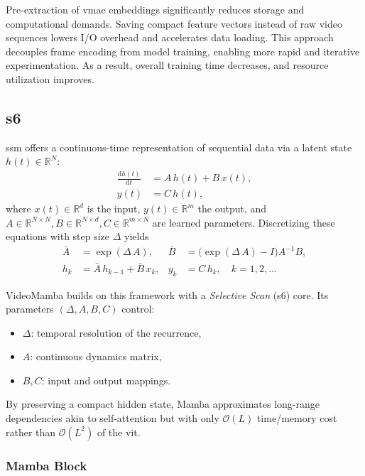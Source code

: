 Pre-extraction of \acrshort{vmae} embeddings significantly reduces storage and computational demands. Saving compact feature vectors instead of raw video sequences lowers I/O overhead and accelerates data loading. This approach decouples frame encoding from model training, enabling more rapid and iterative experimentation. As a result, overall training time decreases, and resource utilization improves.

\subsection{\acrfull{s6}}
\label{ssec:s6}

\acrfull{ssm} offers a continuous-time representation of sequential data via a latent state \(h(t)\in\mathbb{R}^N\):
\begin{align}
    \frac{\mathrm{d}h(t)}{\mathrm{d}t} &= A\,h(t) + B\,x(t),  \label{eq:ssm_continuous1}\\
    y(t) &= C\,h(t),                                    \label{eq:ssm_continuous2}
\end{align}
where \(x(t)\in\mathbb{R}^d\) is the input, \(y(t)\in\mathbb{R}^m\) the output, and \(A\in\mathbb{R}^{N\times N}, B\in\mathbb{R}^{N\times d}, C\in\mathbb{R}^{m\times N}\) are learned parameters.  Discretizing these equations with step size \(\Delta\) yields
\begin{align}
    \bar A &= \exp(\Delta\,A), 
    & 
    \bar B &= \bigl(\exp(\Delta\,A)-I\bigr)A^{-1}B,\\
    h_k &= \bar A\,h_{k-1} + \bar B\,x_k, 
    &
    y_k &= C\,h_k,
    \quad k=1,2,\dots
\end{align}

VideoMamba \cite{li_videomamba_2024} builds on this framework with a \emph{Selective Scan} (\acrshort{s6}) core. Its parameters \((\Delta, A,B,C)\) control:
\begin{itemize}
    \item \(\Delta\): temporal resolution of the recurrence,
    \item \(A\): continuous dynamics matrix,
    \item \(B,C\): input and output mappings.
\end{itemize}

By preserving a compact hidden state, Mamba approximates long-range dependencies akin to self-attention but with only \(\mathcal{O}(L)\) time/memory cost rather than \(\mathcal{O}(L^2)\) of the \acrfull{vit}.  


\subsubsection{Mamba Block}

